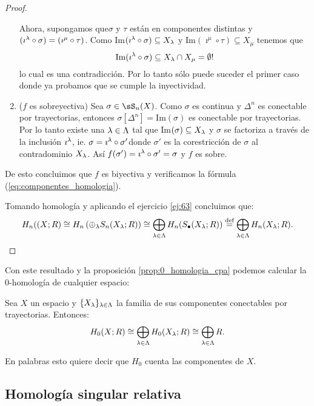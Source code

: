 \documentclass[../../topologia_algebraica]{subfiles}
\begin{document}
\begin{proof}
\begin{enumerate}
    Ahora, supongamos que$\sigma$ y $\tau$ est\'an en componentes distintas y
    $(\imath^{\lambda}\circ\sigma)=(\imath^{\mu}\circ\tau)$. Como
    Im$(\imath^{\lambda}\circ\sigma)\subseteq X_{\lambda}$ y Im$(\imath^{\mu}\circ\tau)\subseteq X_{\mu}$
    tenemos que
    \[
      \text{Im}(\imath^{\lambda}\circ\sigma)\subseteq X_{\lambda}\cap X_{\mu}=\emptyset !
    \]
    lo cual es una contradicci\'on. Por lo tanto s\'olo puede suceder el primer caso donde ya
    probamos que se cumple la inyectividad.
		
  \item($f$ es sobreyectiva) Sea $\sigma\in\sS_n(X)$. Como $\sigma$ es continua y $\Delta^n$
    es conectable por trayectorias, entonces $\sigma[\Delta^n]=$Im$(\sigma)$ es conectable por
    trayectorias. Por lo tanto existe una $\lambda\in\Lambda$ tal que Im$(\sigma)\subseteq X_{\lambda}$ y
    $\sigma$ se factoriza a trav\'es de la inclusi\'on $\imath^{\lambda}$, ie.
    $\sigma=\imath^{\lambda}\circ\sigma'$donde $\sigma'$ es la corestricci\'on de $\sigma$ al
    contradominio $X_{\lambda}$. As\'i $f(\sigma')=\imath^{\lambda}\circ\sigma'=\sigma$ y $f$ es sobre.
  \end{enumerate}
  De esto concluimos que $f$ es biyectiva y verificamos la f\'ormula (\ref{eq:componentes_homologia}).

  Tomando homolog\'ia y aplicando el ejercicio \ref{ej:63} concluimos que:
  \[
    H_n((X;R)\cong
    H_n\left( \oplus_{\lambda} S_n(X_{\lambda};R) \right)\cong
    \bigoplus_{\lambda\in\Lambda}H_n(S_{\bullet}(X_{\lambda};R))\stackrel{\text{def}}{=}
    \bigoplus_{\lambda\in\Lambda}H_n(X_{\lambda};R).
  \]
\end{proof}

Con este resultado y la proposici\'on \ref{prop:0_homologia_cpa} podemos calcular la
0-homolog\'ia de cualquier espacio:

\begin{prop}
  Sea $X$ un espacio y $\{X_{\lambda}\}_{\lambda\in\Lambda}$ la familia de sus componentes conectables
  por trayectorias.
  Entonces:
  \[
    H_0(X;R) \cong \bigoplus_{\lambda\in\Lambda}H_0(X_{\lambda};R)\cong \bigoplus_{\lambda\in\Lambda} R.
  \]
\end{prop}

En palabras esto quiere decir que $H_0$ cuenta las componentes de $X$.

\subsection{Homolog\'ia singular relativa}%
\end{document}
